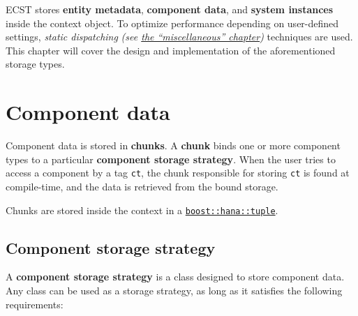 \documentclass[twoside, 12pt, a4paper, openany]{book}
\begin{document}
ECST stores \textbf{entity metadata}, \textbf{component data}, and
\textbf{system instances} inside the context object. To optimize
performance depending on user-defined settings, \emph{static
dispatching} \emph{(see
\protect\hyperlink{appendix_static_dispatching}{the ``miscellaneous''
chapter})} techniques are used. This chapter will cover the design and
implementation of the aforementioned storage types.

\hypertarget{storage_component}{\section{Component
data}\label{storage_component}}

Component data is stored in \textbf{chunks}. A \textbf{chunk} binds one
or more component types to a particular \textbf{component storage
strategy}. When the user tries to access a component by a tag
\texttt{ct},
the chunk responsible for storing
\texttt{ct}
is found at compile-time, and the data is retrieved from the bound
storage.

Chunks are stored inside the context in a
\href{http://www.boost.org/doc/libs/1_61_0/libs/hana/doc/html/structboost_1_1hana_1_1tuple.html}{\texttt{boost::hana::tuple}}.

\hypertarget{storage_comp_strategy}{\subsection{Component storage
strategy}\label{storage_comp_strategy}}

A \textbf{component storage strategy} is a class designed to store
component data. Any class can be used as a storage strategy, as long as
it satisfies the following requirements:
\end{document}
